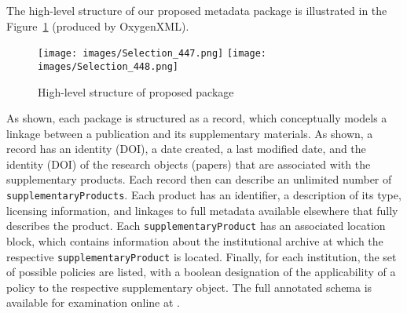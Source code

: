 The high-level structure of our proposed metadata package is illustrated in the Figure~\ref{fig:schema_v1} (produced by OxygenXML). 
\begin{figure}
	\texttt{[image: images/Selection\_447.png]}
	\texttt{[image: images/Selection\_448.png]}
	\caption{\label{fig:schema_v1}High-level structure of proposed package}
\end{figure} 
As shown, each package is structured as a record, which conceptually models a linkage between a publication and its supplementary materials.  As shown, a record has an identity (\ac{DOI}), a date created, a last modified date, and the identity (\ac{DOI}) of the research objects (papers) that are associated with the supplementary products.
Each record then can describe an unlimited number of \texttt{supplementaryProducts}.  Each product has an identifier, a description of its type, licensing information, and linkages to full metadata available elsewhere that fully describes the product.  Each \texttt{supplementaryProduct} has an associated location block, which contains information about the institutional archive at which the respective \texttt{supplementaryProduct} is located.  Finally, for each institution, the set of possible policies are listed, with a boolean designation of the applicability of a policy to the respective supplementary object.   
The full annotated schema is available for examination online at 
\iftoggle{blind}{[URL blinded - please contact JOURNAL]}{\href{https://github.com/labordynamicsinstitute/metajelo}{github.com/labordynamicsinstitute/metajelo}}.

%


